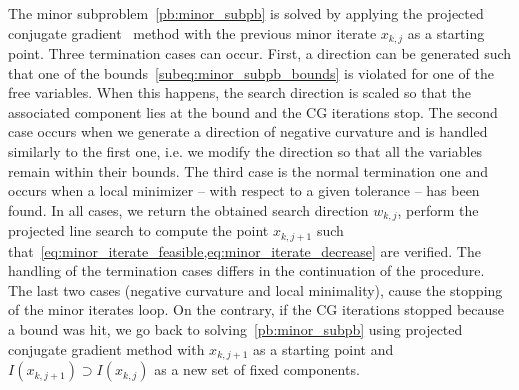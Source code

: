 The minor subproblem~\eqref{pb:minor_subpb} is solved by applying the projected conjugate gradient~\cite{gould-etal:2001} method with the previous minor iterate $x_{k,j}$ as a starting point. Three termination cases can occur. First, a direction can be generated such that one of the bounds~\eqref{subeq:minor_subpb_bounds} is violated for one of the free variables. When this happens, the search direction is scaled so that the associated component lies at the bound and the CG iterations stop. The second case occurs when we generate a direction of negative curvature and is handled similarly to the first one, i.e. we modify the direction so that all the variables remain within their bounds. The third case is the normal termination one and occurs when a local minimizer -- with respect to a given tolerance -- has been found. In all cases, we return the obtained search direction $w_{k,j}$, perform the projected line search to compute the point $x_{k,j+1}$ such that~\cref{eq:minor_iterate_feasible,eq:minor_iterate_decrease} are verified. The handling of the termination cases differs in the continuation of the procedure. The last two cases (negative curvature and local minimality), cause the stopping of the minor iterates loop. On the contrary, if the CG iterations stopped because a bound was hit, we go back to solving~\eqref{pb:minor_subpb} using projected conjugate gradient method with $x_{k,j+1}$ as a starting point and $I(x_{k,j+1}) \supset I(x_{k,j})$ as a new set of fixed components.

